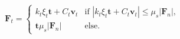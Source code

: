 \begin{equation}
\mathbf{F}_t = 
 \begin{cases}
k_t \xi_t \mathbf{t} + C_t \mathbf{v}_t  & \text{if } |k_t \xi_t \mathbf{t} +
C_t \mathbf{v}_t| \leq \mu_s |\mathbf{F}_n| ,\\
\mathbf{t} \mu_s |\mathbf{F}_n|  & \text{else.}
\end{cases}
 \label{eq:ft}
\end{equation}
